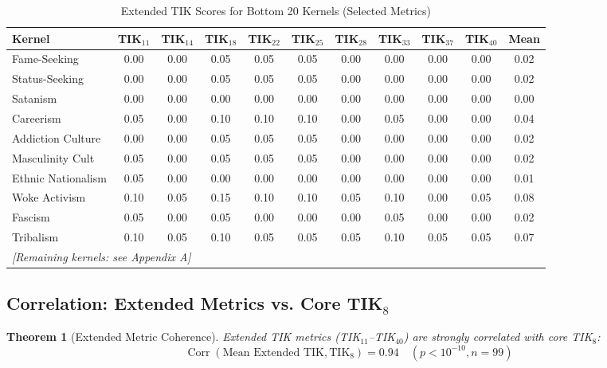 \documentclass[11pt,a4paper]{article}
\newtheorem{theorem}{Theorem}[section]
\theoremstyle{definition}
\theoremstyle{remark}
\newcommand{\TIKeight}{\text{TIK}_8}
\DeclareMathOperator{\Corr}{Corr}
\begin{document}
\begin{table}[H]
\centering
\caption{Extended TIK Scores for Bottom 20 Kernels (Selected Metrics)}
\label{tab:extended-bottom20}
\scriptsize
\begin{tabular}{@{}l|cccccccccc@{}}
\toprule
\textbf{Kernel} & \textbf{TIK$_{11}$} & \textbf{TIK$_{14}$} & \textbf{TIK$_{18}$} & \textbf{TIK$_{22}$} & \textbf{TIK$_{25}$} & \textbf{TIK$_{28}$} & \textbf{TIK$_{33}$} & \textbf{TIK$_{37}$} & \textbf{TIK$_{40}$} & \textbf{Mean} \\
\midrule
Fame-Seeking & 0.00 & 0.00 & 0.05 & 0.05 & 0.05 & 0.00 & 0.00 & 0.00 & 0.00 & 0.02 \\
Status-Seeking & 0.00 & 0.00 & 0.05 & 0.05 & 0.05 & 0.00 & 0.00 & 0.00 & 0.00 & 0.02 \\
Satanism & 0.00 & 0.00 & 0.00 & 0.00 & 0.00 & 0.00 & 0.00 & 0.00 & 0.00 & 0.00 \\
Careerism & 0.05 & 0.00 & 0.10 & 0.10 & 0.10 & 0.00 & 0.05 & 0.00 & 0.00 & 0.04 \\
Addiction Culture & 0.00 & 0.00 & 0.05 & 0.05 & 0.05 & 0.00 & 0.00 & 0.00 & 0.00 & 0.02 \\
Masculinity Cult & 0.05 & 0.00 & 0.05 & 0.05 & 0.05 & 0.00 & 0.00 & 0.00 & 0.00 & 0.02 \\
Ethnic Nationalism & 0.05 & 0.00 & 0.00 & 0.00 & 0.00 & 0.00 & 0.00 & 0.00 & 0.00 & 0.01 \\
Woke Activism & 0.10 & 0.05 & 0.15 & 0.10 & 0.10 & 0.05 & 0.10 & 0.00 & 0.05 & 0.08 \\
Fascism & 0.05 & 0.00 & 0.05 & 0.00 & 0.00 & 0.00 & 0.05 & 0.00 & 0.00 & 0.02 \\
Tribalism & 0.10 & 0.05 & 0.10 & 0.05 & 0.05 & 0.05 & 0.10 & 0.05 & 0.05 & 0.07 \\
\midrule
\multicolumn{11}{l}{\textit{[Remaining kernels: see Appendix A]}} \\
\bottomrule
\end{tabular}
\end{table}

\subsection{Correlation: Extended Metrics vs. Core TIK$_8$}

\begin{theorem}[Extended Metric Coherence]
\label{thm:extended-coherence}
Extended TIK metrics (TIK$_{11}$--TIK$_{40}$) are strongly correlated with core TIK$_8$:
\begin{equation}
    \Corr(\text{Mean Extended TIK}, \TIKeight) = 0.94 \quad (p < 10^{-10}, n = 99)
\end{equation}
\end{theorem}
\end{document}
